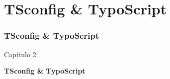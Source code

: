 %

\section{TSconfig \& TypoScript}
\begin{frame}[fragile]
	\frametitle{TSconfig \& TypoScript}

	\begin{center}\huge{Capítulo 2:}\end{center}
	\begin{center}\huge{\color{typo3darkgrey}\textbf{TSconfig \& TypoScript}}\end{center}

\end{frame}


